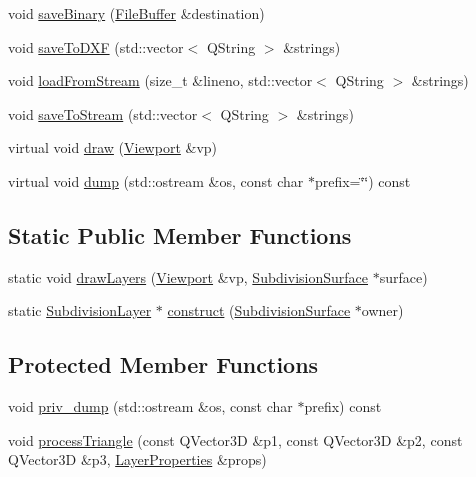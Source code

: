 \begin{DoxyCompactItemize}
void \hyperlink{classShipCADGeometry_1_1SubdivisionLayer_a35b72f27a1d354dcc6f3b844687d91e8}{save\-Binary} (\hyperlink{classShipCADGeometry_1_1FileBuffer}{File\-Buffer} \&destination)
\item 
void \hyperlink{classShipCADGeometry_1_1SubdivisionLayer_ac4e18cba13ce798c2ca89f07c443b09b}{save\-To\-D\-X\-F} (std\-::vector$<$ Q\-String $>$ \&strings)
\item 
void \hyperlink{classShipCADGeometry_1_1SubdivisionLayer_af86299eea0a5a472d1edfae2706e335a}{load\-From\-Stream} (size\-\_\-t \&lineno, std\-::vector$<$ Q\-String $>$ \&strings)
\item 
void \hyperlink{classShipCADGeometry_1_1SubdivisionLayer_a502c7889a73015d4295fb922c92c78be}{save\-To\-Stream} (std\-::vector$<$ Q\-String $>$ \&strings)
\item 
virtual void \hyperlink{classShipCADGeometry_1_1SubdivisionLayer_a86f8600ffbf3973bc31c99bdb9e5b18d}{draw} (\hyperlink{classShipCADGeometry_1_1Viewport}{Viewport} \&vp)
\item 
virtual void \hyperlink{classShipCADGeometry_1_1SubdivisionLayer_ab41e005f720a2bba4b2efa74bfd5943e}{dump} (std\-::ostream \&os, const char $\ast$prefix=\char`\"{}\char`\"{}) const 
\end{DoxyCompactItemize}
\subsection*{Static Public Member Functions}
\begin{DoxyCompactItemize}
\item 
static void \hyperlink{classShipCADGeometry_1_1SubdivisionLayer_a838537201ca31bc92a38585c87eb56e9}{draw\-Layers} (\hyperlink{classShipCADGeometry_1_1Viewport}{Viewport} \&vp, \hyperlink{classShipCADGeometry_1_1SubdivisionSurface}{Subdivision\-Surface} $\ast$surface)
\item 
static \hyperlink{classShipCADGeometry_1_1SubdivisionLayer}{Subdivision\-Layer} $\ast$ \hyperlink{classShipCADGeometry_1_1SubdivisionLayer_a7d41b9d0ff65032014ec52ff846f32a7}{construct} (\hyperlink{classShipCADGeometry_1_1SubdivisionSurface}{Subdivision\-Surface} $\ast$owner)
\end{DoxyCompactItemize}
\subsection*{Protected Member Functions}
\begin{DoxyCompactItemize}
\item 
void \hyperlink{classShipCADGeometry_1_1SubdivisionLayer_a80009b02c31a01e2de9f93d5982b9a63}{priv\-\_\-dump} (std\-::ostream \&os, const char $\ast$prefix) const 
\item 
void \hyperlink{classShipCADGeometry_1_1SubdivisionLayer_abea7581d3e0b740de8db1dfd6bc9bf69}{process\-Triangle} (const Q\-Vector3\-D \&p1, const Q\-Vector3\-D \&p2, const Q\-Vector3\-D \&p3, \hyperlink{structShipCADGeometry_1_1LayerProperties}{Layer\-Properties} \&props)
\end{DoxyCompactItemize}
